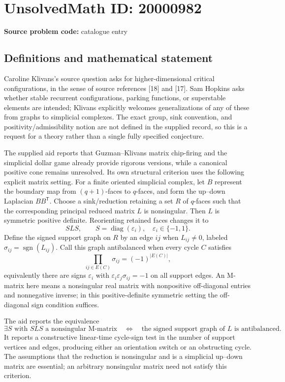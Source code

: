 \documentclass[11pt]{article}
\begin{document}
\section*{UnsolvedMath ID: 20000982}
\textbf{Source problem code:} catalogue entry
\subsection{Definitions and mathematical statement}
Caroline Klivans's source question asks for higher-dimensional critical configurations, in the sense of source references [18] and [17]. Sam Hopkins asks whether stable recurrent configurations, parking functions, or superstable elements are intended; Klivans explicitly welcomes generalizations of any of these from graphs to simplicial complexes. The exact group, sink convention, and positivity/admissibility notion are not defined in the supplied record, so this is a request for a theory rather than a single fully specified conjecture.

The supplied aid reports that Guzman--Klivans matrix chip-firing and the simplicial dollar game already provide rigorous versions, while a canonical positive cone remains unresolved. Its own structural criterion uses the following explicit matrix setting. For a finite oriented simplicial complex, let \(B\) represent the boundary map from \((q+1)\)-faces to \(q\)-faces, and form the up--down Laplacian \(BB^{\mathsf T}\). Choose a sink/reduction retaining a set \(R\) of \(q\)-faces such that the corresponding principal reduced matrix \(L\) is nonsingular. Then \(L\) is symmetric positive definite. Reorienting retained faces changes it to
\[
 SLS,\qquad S=\operatorname{diag}(\varepsilon_i),\quad\varepsilon_i\in\{-1,1\}.
\]
Define the signed support graph on \(R\) by an edge \(ij\) when \(L_{ij}\ne0\), labeled \(\sigma_{ij}=\operatorname{sgn}(L_{ij})\). Call this graph antibalanced when every cycle \(C\) satisfies
\[
 \prod_{ij\in E(C)}\sigma_{ij}=(-1)^{|E(C)|},
\]
equivalently there are signs \(\varepsilon_i\) with \(\varepsilon_i\varepsilon_j\sigma_{ij}=-1\) on all support edges. An M-matrix here means a nonsingular real matrix with nonpositive off-diagonal entries and nonnegative inverse; in this positive-definite symmetric setting the off-diagonal sign condition suffices.

The aid reports the equivalence
\[
 \exists S\text{ with }SLS\text{ a nonsingular M-matrix}
 \quad\Longleftrightarrow\quad
 \text{the signed support graph of }L\text{ is antibalanced}.
\]
It reports a constructive linear-time cycle-sign test in the number of support vertices and edges, producing either an orientation switch or an obstructing cycle. The assumptions that the reduction is nonsingular and is a simplicial up--down matrix are essential; an arbitrary nonsingular matrix need not satisfy this criterion.
\end{document}
